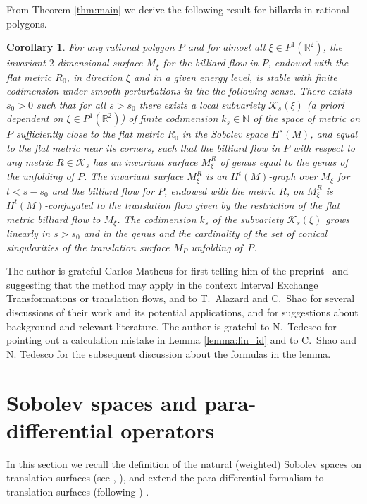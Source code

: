 \documentclass[11pt]{amsart}
\newcommand \R {{ \mathbb R}}
\newcommand \N {{ \mathbb N}}
\newtheorem{corollary}[theorem]{Corollary}
\begin{document}
From Theorem \ref{thm:main} we derive the following result for billards in rational polygons.

\begin{corollary} For any  rational polygon $P$ and for almost all $\xi \in P^1(\R^2)$, the invariant $2$-dimensional surface $M_\xi$ for the billiard flow in $P$, endowed with the flat metric $R_0$,   in direction $\xi$ and in a given energy level, is stable with finite codimension under smooth perturbations in the the following sense.   
There exists $s_0>0$ such that for all $s>s_0$ there exists a local subvariety  $\mathcal K_s(\xi) $ (a priori dependent on $\xi \in P^1(\R^2)$)  of finite codimension $k_s\in \N$ of the space of metric on $P$ sufficiently close to the  flat metric $R_0$
 in the Sobolev space $H^s(M)$, and equal to the flat metric near its corners, such that the billiard flow in $P$ with respect to any metric $R\in \mathcal K_s$  has 
 an invariant surface $M^R_\xi$ of genus equal to the genus of the unfolding of $P$. The invariant surface $M^R_\xi$ is an $H^t(M)$-graph over 
$M_\xi$  for $t<s-s_0$ and the billiard flow for $P$, endowed with the metric $R$,  on $M^R_\xi$ is $H^t(M)$-conjugated to the translation flow given by the restriction 
of the flat metric billiard flow to $M_\xi$. 
The codimension $k_s$ of the subvariety $\mathcal K_s(\xi)$ grows linearly in $s>s_0$ and in the genus  and the cardinality of the set of
conical singularities of the translation surface $M_P$ unfolding of~$P$.


\end{corollary} 

\medskip
{} The author is grateful Carlos Matheus for first telling him of the preprint~\cite{AlSh} and suggesting that the method may apply in the
context Interval Exchange Transformations or translation flows, and to T.~Alazard and C.~Shao for several discussions of their work and its potential applications, and
for suggestions about background and relevant literature. The author is grateful to N.~Tedesco for pointing out a calculation mistake in Lemma \ref{lemma:lin_id}
and to C.~Shao and N. Tedesco for the subsequent discussion about the formulas in the lemma.



\section{Sobolev spaces and para-differential operators}

In this section we recall the definition of the natural (weighted) Sobolev spaces on translation surfaces (see \cite{F97}, \cite{F21}), and  extend the para-differential 
formalism to translation surfaces (following \cite{AlSh}) . 
\end{document}
